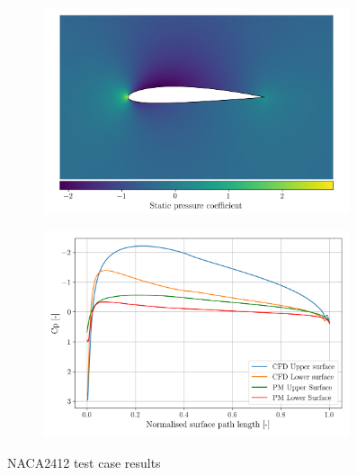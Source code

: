 \documentclass{article}
\begin{document}
\begin{figure}[H]
    \centering
    \begin{subfigure}{0.49\textwidth}
        \centering
        \includegraphics[width=0.99\textwidth]{figures/naca2412_cp.png}
        \caption{}
        \label{fig:naca2412_cp}
    \end{subfigure}
    \begin{subfigure}{0.49\textwidth}
        \centering
        \includegraphics[width=0.99\textwidth]{figures/naca2412_surface_cp.png}
        \caption{}
        \label{fig:naca2412_mach}
    \end{subfigure}
    \caption{NACA2412 test case results}
\end{figure}
\end{document}
